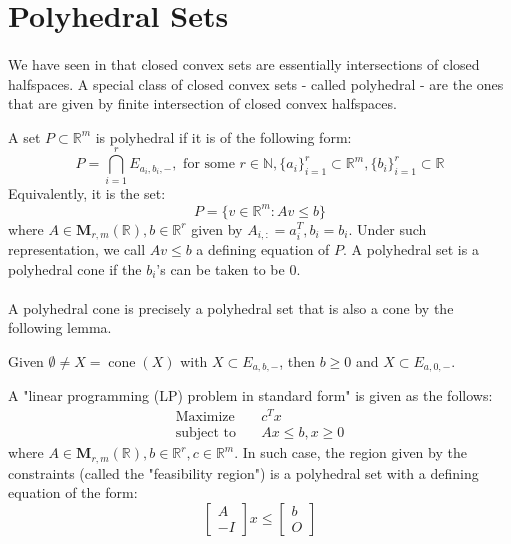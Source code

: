 \section{Polyhedral Sets}
\label{sect:017}

\paragraph{}We have seen in  that closed convex sets are essentially intersections of closed halfspaces. A special class of closed convex sets - called polyhedral - are the ones that are given by finite intersection of closed convex halfspaces.

\begin{defn}\label{defn:017-polyhedral-sets}
	A set $P\subset \mathbb{R}^m$ is polyhedral if it is of the following form:
	\[
		P=\bigcap_{i=1}^rE_{a_i,b_i,-},\text{ for some }r\in \mathbb{N},\{a_i\}_{i=1}^r\subset\mathbb{R}^m,\{b_i\}_{i=1}^r\subset\mathbb{R}
	\]
	Equivalently, it is the set:
	\[
		P=\{v\in \mathbb{R}^m:Av\leq b\}
	\]
	where $A\in \mathbf{M}_{r,m}(\mathbb{R}),b\in \mathbb{R}^r$ given by $A_{i,:}=a_i^T,b_i=b_i$. Under such representation, we call $Av\leq b$ a defining equation of $P$. A polyhedral set is a polyhedral cone if the $b_i$'s can be taken to be $0$.
\end{defn}

\paragraph{}A polyhedral cone is precisely a polyhedral set that is also a cone by the following lemma.

\begin{lemm}\label{lemm:017-promotion}
	Given $\emptyset\neq X=\operatorname{cone}(X)$ with $X\subset E_{a,b,-}$, then $b\geq 0$ and $X\subset E_{a,0,-}$.
\end{lemm}

\begin{exmp}
	A "linear programming (LP) problem in standard form" is given as the follows:
	\begin{align*}
		\text{Maximize}\quad   & c^Tx              \\
		\text{subject to}\quad & Ax\leq b, x\geq 0
	\end{align*}
	where $A\in \mathbf{M}_{r,m}(\mathbb{R}),b\in \mathbb{R}^r,c\in \mathbb{R}^m$. In such case, the region given by the constraints (called the "feasibility region") is a polyhedral set with a defining equation of the form:
	\[
		\left[
			\begin{array}{r}
				A \\\hline
				-I
			\end{array}
			\right]
		x\leq
		\left[
			\begin{array}{r}
				b \\\hline
				O
			\end{array}
			\right]
	\]
\end{exmp}

